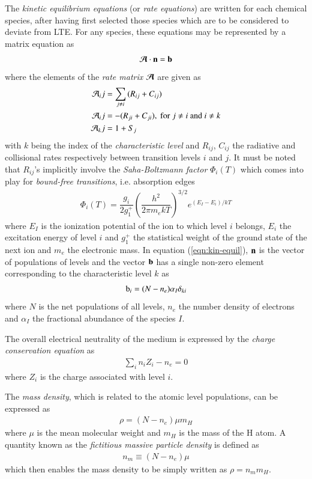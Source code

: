 		The \textit{kinetic equilibrium equations} (or \textit{rate equations}) are written for each chemical species, after having first selected those species which are to be considered to deviate from LTE. For any species, these equations may be represented by a matrix equation as
		\begin{align}
			\boldsymbol{\mathcal{A}}\cdot\boldsymbol{\mathrm{n}}=\boldsymbol{\mathrm{b}} \label{eqn:kin-equil}
		\end{align}
		where the elements of the \textit{rate matrix} $\boldsymbol{\mathcal{A}}$ are given as
		\begin{align*}
			\mathcal{A}_{i}{j}&=\sum_{j\neq i}{(R_{ij}+C_{ij})} \\
			\mathcal{A}_{i}{j}&=-(R_{ji}+C_{ji}),\text{ for }j\neq i\text{ and }i\neq k \\
			\mathcal{A}_{k}{j}&=1+S_j
		\end{align*}
		with $k$ being the index of the \textit{characteristic level} and $R_{ij}$, $C_{ij}$ the radiative and collisional rates respectively between transition levels $i$ and $j$. It must be noted that $R_{ij}$'s implicitly involve the \textit{Saha-Boltzmann factor} $\Phi_i(T)$ which comes into play for \textit{bound-free transitions}, i.e. absorption edges
		\begin{align}
			\Phi_i(T)=\dfrac{g_i}{2g_1^+}\left( \dfrac{h^2}{2\pi m_e kT} \right)^{3/2}e^{(E_I-E_i)/kT} \label{eqn:saha-boltz-factor}
		\end{align}
		where $E_I$ is the ionization potential of the ion to which level $i$ belongs, $E_i$ the excitation energy of level $i$ and $g_1^+$ the statistical weight of the ground state of the next ion and $m_e$ the electronic mass. In equation (\ref{eqn:kin-equil}), $\boldsymbol{\mathrm{n}}$ is the vector of populations of levels and the vector $\boldsymbol{\mathrm{b}}$ has a single non-zero element corresponding to the characteristic level $k$ as
		\begin{align*}
			\mathrm{b}_{i}=(N-n_e)\alpha_I\delta_{ki}
		\end{align*}
		where $N$ is the net populations of all levels, $n_e$ the number density of electrons and $\alpha_I$ the fractional abundance of the species $I$.
		
		The overall electrical neutrality of the medium is expressed by the \textit{charge conservation equation} as
		\begin{align}
			\sum_i{n_iZ_i}-n_e=0 \label{eqn:ch-cons}
		\end{align}
		where $Z_i$ is the charge associated with level $i$.
		
		The \textit{mass density}, which is related to the atomic level populations, can be expressed as
		\begin{align}
			\rho=(N-n_e)\mu m_H \label{eqn:mass-dens}
		\end{align}
		where $\mu$ is the mean molecular weight and $m_H$ is the mass of the H atom. A quantity known as the \textit{fictitious massive particle density} is defined as
		\begin{align}
			n_m\equiv(N-n_e)\mu \label{eqn:fict-mass-dens}
		\end{align}
		which then enables the mass density to be simply written as $\rho=n_m m_H$.
		
